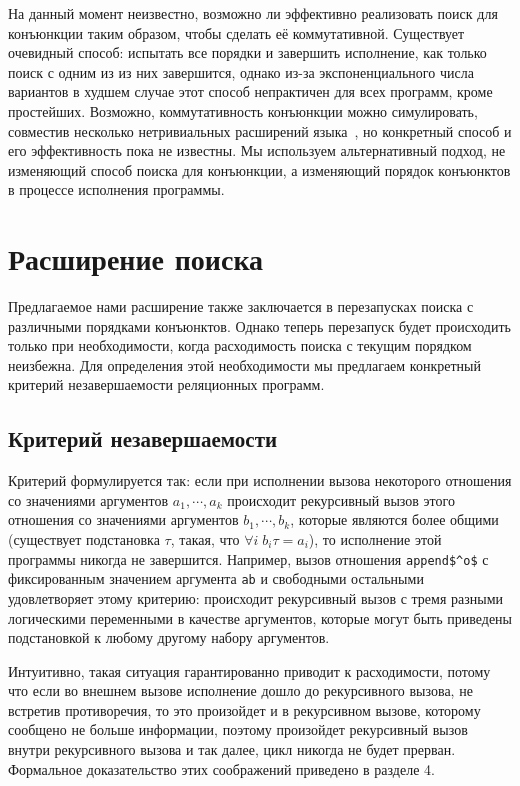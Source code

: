     На данный момент неизвестно, возможно ли эффективно реализовать поиск для конъюнкции таким образом, чтобы сделать её коммутативной. Существует очевидный способ: испытать все порядки и завершить исполнение, как только поиск с одним из из них завершится, однако из-за экспоненциального числа вариантов в худшем случае этот способ непрактичен для всех программ, кроме простейших. Возможно, коммутативность конъюнкции можно симулировать, совместив несколько нетривиальных расширений языка~\cite{WillThesis}, но конкретный способ и его эффективность пока не известны. Мы используем альтернативный подход, не изменяющий способ поиска для конъюнкции, а изменяющий порядок конъюнктов в процессе исполнения программы.
    
  \section{Расширение поиска}
    
    Предлагаемое нами расширение также заключается в перезапусках поиска с различными порядками конъюнктов. Однако теперь перезапуск будет происходить только при необходимости, когда расходимость поиска с текущим порядком неизбежна. Для определения этой необходимости мы предлагаем конкретный критерий незавершаемости реляционных программ.
    
  \subsection{Критерий незавершаемости}
  
    Критерий формулируется так: если при исполнении вызова некоторого отношения со значениями аргументов $a_1, \cdots, a_k$ происходит рекурсивный вызов этого отношения со значениями аргументов $b_1, \cdots, b_k$, которые являются более общими (существует подстановка $\tau$, такая, что $\forall i\;b_i \tau = a_i$), то исполнение этой программы никогда не завершится. Например, вызов отношения \lstinline|append$^o$| с фиксированным значением аргумента \lstinline|ab| и свободными остальными удовлетворяет этому критерию: происходит рекурсивный вызов с тремя разными логическими переменными в качестве аргументов, которые могут быть приведены подстановкой к любому другому набору аргументов.
    
    Интуитивно, такая ситуация гарантированно приводит к расходимости, потому что если во внешнем вызове исполнение дошло до рекурсивного вызова, не встретив противоречия, то это произойдет и в рекурсивном вызове, которому сообщено не больше информации, поэтому произойдет рекурсивный вызов внутри рекурсивного вызова и так далее, цикл никогда не будет прерван. Формальное доказательство этих соображений приведено в разделе 4.
    
